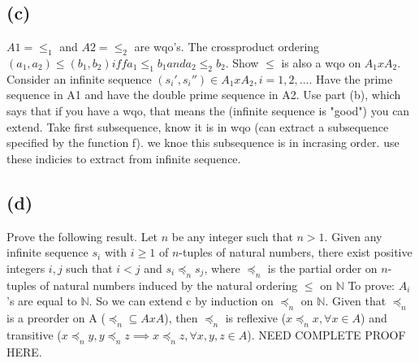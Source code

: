 \documentclass[12pt]{article}
\begin{document}
\subsection*{(c)}
$ A1 = \le_1$ and $A2 = \le_2$ are wqo's.
The crossproduct ordering $(a_1,a_2) \le (b_1, b_2)
iff a_1 \le_1 b_1 and a_2 \le_2 b_2$.
Show $\le$ is also a wqo on $A_1 x A_2$.
Consider an infinite sequence $(s_i ' , s_i '') \in A_1 x A_2, i = 1,2,...$.
Have the prime sequence in A1 and have the double prime sequence in A2.
Use part (b), which says that if you have a wqo, that means the
(infinite sequence is "good") you can extend. Take first subsequence,
know it is in wqo (can extract a subsequence specified by the function f).
we knoe this subsequence is in incrasing order. use these indicies to extract
from infinite sequence.

\subsection*{(d)}
Prove the following result.
\newline
Let $n$ be any  integer such that $n>1$.
Given any infinite sequence $s_i$ with $i \ge 1$ of $n$-tuples of
natural numbers, there exist positive integers $i, j$ such that
$i<j$ and $s_{i}\preceq_{n} s_{j}$, where $\preceq_{n}$ is the
partial order on $n$-tuples of natural numbers
induced by the natural ordering $\le$ on $\mathbb{N}$
To prove: $A_i$'s are equal to $\mathbb{N}$.
So we can extend c by induction on $\preceq_{n}$ on $\mathbb{N}$.
Given that $\preceq_{n}$ is a preorder on A ($\preceq_{n} \subseteq AxA$),
then $\preceq_{n}$ is reflexive ($ x \preceq_{n} x,\forall x \in A$)
and transitive ($x \preceq_{n} y, y \preceq_{n} z \implies x \preceq_{n} z,
\forall x,y,z \in A$). NEED COMPLETE PROOF HERE.
\end{document}
